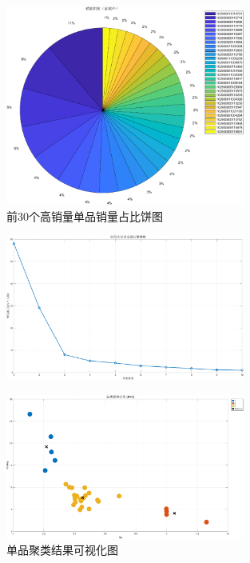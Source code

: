 \documentclass{cumcmthesis}
\begin{document}
\begin{figure}[H]
    \centering
    \includegraphics[width=0.7\textwidth]{销量饼图(前30个).png} 
    \caption{前30个高销量单品销量占比饼图}
\end{figure}

\begin{figure}[H]
    \centering
    \includegraphics[width=0.7\textwidth]{聚类肘部图.png}
\end{figure}

\begin{figure}[H]
    \centering
    \includegraphics[width=0.7\textwidth]{聚类结果可视化.png}
    \caption{单品聚类结果可视化图}
\end{figure}
\end{document}
